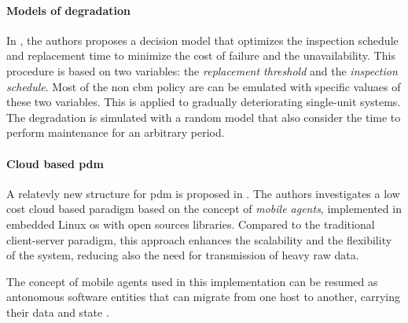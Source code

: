 \paragraph*{Models of degradation}
In \cite{Pred_Maint_Tech_Grall}, the authors proposes a decision model that optimizes the inspection schedule and replacement time to minimize the cost of failure and the unavailability. This procedure is based on two variables: the \emph{replacement threshold} and the \emph{inspection schedule}. Most of the non \gls{cbm} policy are can be emulated with specific valuaes of these two variables. This is applied to gradually deteriorating single-unit systems. The degradation is simulated with a random model that also consider the time to perform maintenance for an arbitrary period.

\paragraph*{Cloud based \gls{pdm}}
A relatevly new structure for \gls{pdm} is proposed in \cite{CloudBased_Wang}. The authors investigates a low cost cloud based paradigm based on the concept of \emph{mobile agents}, implemented in embedded Linux \gls{os} with open sources libraries. Compared to the traditional client-server paradigm, this approach enhances the scalability and the flexibility of the system, reducing also the need for transmission of heavy raw data.

The concept of mobile agents used in this implementation can be resumed as antonomous software entities that can migrate from one host to another, carrying their data and state \cite{CUCURULL2009712}.
